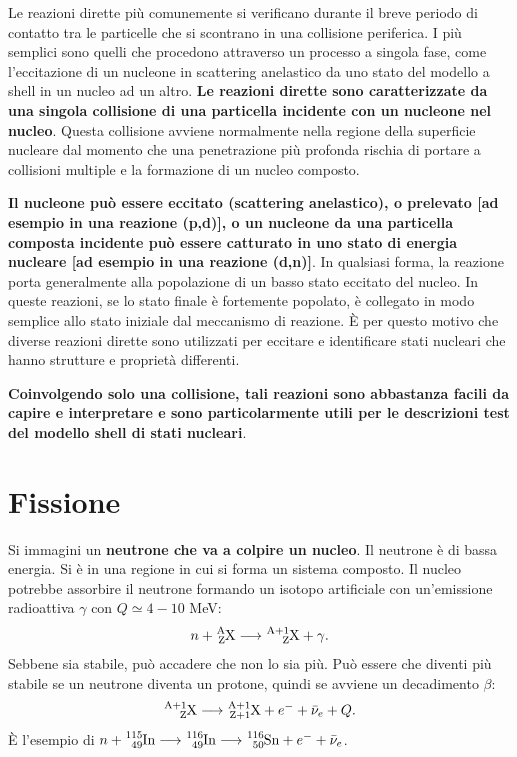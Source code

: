 \documentclass[a4paper,11pt,twoside,openany]{book}
\theoremstyle{definition}
\theoremstyle{plain}
\theoremstyle{plain}
\theoremstyle{definition}
\begin{document}
Le reazioni dirette più comunemente si verificano durante il breve periodo di contatto tra le particelle che si scontrano in una collisione periferica. I più semplici sono quelli che procedono attraverso un processo a singola fase, come l'eccitazione di un nucleone in scattering anelastico da uno stato del modello a shell in un nucleo ad un altro. \textbf{Le reazioni dirette sono caratterizzate da una singola collisione di una particella incidente con un nucleone nel nucleo}. Questa collisione avviene normalmente nella regione della superficie nucleare dal momento che una penetrazione più profonda rischia di portare a collisioni multiple e la formazione di un nucleo composto.

\textbf{Il nucleone può essere eccitato (scattering anelastico), o prelevato [ad esempio in una reazione (p,d)], o un nucleone da una particella composta incidente può essere catturato in uno stato di energia nucleare [ad esempio in una reazione (d,n)]}. In qualsiasi forma, la reazione porta generalmente alla popolazione di un basso stato eccitato del nucleo. In queste reazioni, se lo stato finale è fortemente popolato, è collegato in modo semplice allo stato iniziale dal meccanismo di reazione. È per questo motivo che diverse reazioni dirette sono utilizzati per eccitare e identificare stati nucleari che hanno strutture e proprietà differenti.

\textbf{Coinvolgendo solo una collisione, tali reazioni sono abbastanza facili da capire e interpretare e sono particolarmente utili per le descrizioni test del modello shell di stati nucleari}.

\chapter{Fissione} %
Si immagini un \textbf{neutrone che va a colpire un nucleo}. Il neutrone è di bassa energia. Si è in una regione in cui si forma un sistema composto. Il nucleo potrebbe assorbire il neutrone formando un isotopo artificiale con un'emissione radioattiva $\gamma$ con $Q\simeq \si{4-10}$ \si{MeV}: $$n+\ce{^A_ZX}\longrightarrow \ce{^{A+1}_ZX}+\gamma.$$ Sebbene  sia stabile, può accadere che  non lo sia più. Può essere che diventi più stabile se un neutrone diventa un protone, quindi se avviene un decadimento $\beta$: $$\ce{^{A+1}_ZX}\longrightarrow \ce{^{A+1}_{Z+1}X}+e^-+\bar\nu_e+Q.$$ È l'esempio di $n+\ce{^{115}_{49}In} \longrightarrow \ce{^{116}_{49}In}\longrightarrow \ce{^{116}_{50}Sn}+e^-+\bar\nu_e$.
\end{document}

